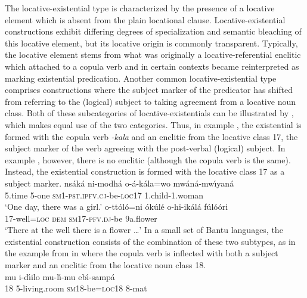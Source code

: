 \documentclass[output=paper]{langscibook}
\begin{document}
The locative-existential type is characterized by the presence of a
locative element which is absent from the plain locational clause.
Locative-existential constructions exhibit differing degrees of
specialization and semantic bleaching of this locative element, but its
locative origin is commonly transparent. Typically, the locative element
stems from what was originally a locative-referential enclitic which
attached to a copula verb and in certain contexts became reinterpreted as
marking existential predication. Another common locative-existential type comprises constructions where the subject marker of the predicator has shifted from referring to the (logical) subject to taking agreement from a locative noun class. Both of these subcategories of locative-existentials can be illustrated by , which makes equal use of the two categories. Thus, in example , the existential is formed with the copula verb \textit{-kala} and an enclitic from the locative class 17, the subject marker of the verb agreeing with the post-verbal (logical) subject. In example , however, there is no enclitic (although the copula verb is the same). Instead, the existential construction is formed with the locative class 17 as a subject marker.
\ea\label{ex:cuwabo-girl-flower}
\ea\label{ex:cuwabo-girl}
\gll ns{\'a}k\'a ni-modh\'a o-{\'a}-k{\'a}la=wo mw{\'a}n{\'a}-mw{\'\i}yan\'a\\
	5.time 5-one \textsc{sm}1-\textsc{pst.ipfv.cj}-be-\textsc{loc}17 1.child-1.woman\\
\glt `One day, there was a girl.'
\ex\label{ex:cuwabo-flower}
\gll o-tt{\'o}l{\'o}=ni {\'o}k{\'u}l\'e o-hi-ik{\'a}l\'a f{\'u}l{\'o}{\'o}ri\\
	17-well=\textsc{loc} \textsc{dem} \textsc{sm}17-\textsc{pfv.dj}-be   9a.flower\\
\glt `There at the well there is a flower \ldots{}'
\z\z
In a small set of Bantu languages, the existential construction consists of the combination of these two subtypes, as in the example from  in  where the copula verb is inflected with both a subject marker and an enclitic from the locative noun class 18.
\ea\label{ex:lusoga-livingroom}
\\
\gll mu i-d{\'\i}ilo mu-l{\'\i}-mu eb{\'\i}-samp\'a\\
	18 5-living.room \textsc{sm}18-be=\textsc{loc}18 8-mat\\
\end{document}
